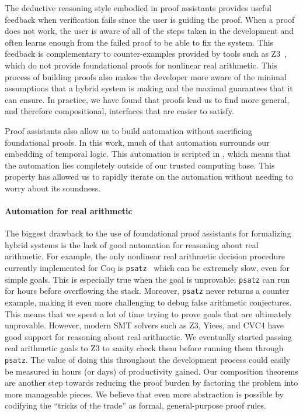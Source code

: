 The deductive reasoning style embodied in proof assistants provides useful
feedback when verification fails since the user is guiding the proof.  When
a proof does not work, the user is aware of all of the steps taken in the
development and often learns enough from the failed proof to be able to fix
the system.  This feedback is complementary to counter-examples provided by
tools such as Z3~\cite{demoura2008z3}, which do not provide foundational
proofs for nonlinear real arithmetic.  This process of building proofs also
makes the developer more aware of the minimal assumptions that a hybrid
system is making and the maximal guarantees that it can ensure.  In
practice, we have found that proofs lead us to find more general, and
therefore compositional, interfaces that are easier to satisfy.

Proof assistants also allow us to build automation without sacrificing
foundational proofs.  In this work, much of that automation surrounds our
embedding of temporal logic.  This automation is scripted in \ltac, which
means that the automation lies completely outside of our trusted computing
base.  This property has allowed us to rapidly iterate on the automation
without needing to worry about its soundness.

\paragraph*{Automation for real arithmetic}
The biggest drawback to the use of foundational proof assistants for
formalizing hybrid systems is the lack of good automation for reasoning
about real arithmetic.  For example, the only nonlinear real arithmetic
decision procedure currently implemented for Coq is
\texttt{psatz}~\cite{besson2007micromega} which can be extremely slow, even
for simple goals.  This is especially true when the goal is unprovable;
\texttt{psatz} can run for hours before overflowing the stack. Moreover,
\texttt{psatz} never returns a counter example, making it even more
challenging to debug false arithmetic conjectures.  This means that we
spent a lot of time trying to prove goals that are ultimately unprovable.
However, modern SMT solvers such as Z3, Yices, and CVC4 have good support
for reasoning about real arithmetic.  We eventually started passing real
arithmetic goals to Z3 to sanity check them before running them through
\texttt{psatz}.  The value of doing this throughout the development process
could easily be measured in hours (or days) of productivity gained.  Our
composition theorems are another step towards reducing the proof burden by
factoring the problem into more manageable pieces.  We believe that even
more abstraction is possible by codifying the ``tricks of the trade'' as
formal, general-purpose proof rules.

